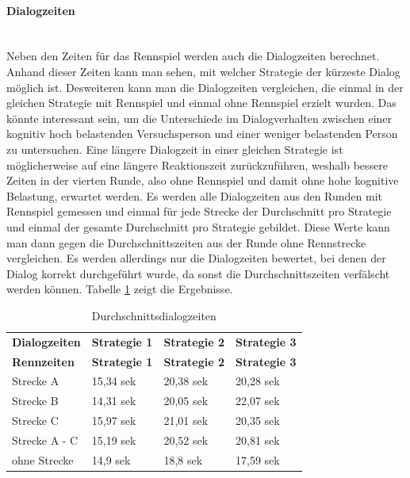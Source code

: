\documentclass[12pt,a4paper]{scrartcl}
\begin{document}
\paragraph{Dialogzeiten}
~\\
Neben den Zeiten für das Rennspiel werden auch die Dialogzeiten berechnet. Anhand dieser Zeiten kann man sehen, mit welcher Strategie der kürzeste Dialog möglich ist. Desweiteren kann man die Dialogzeiten vergleichen, die einmal in der gleichen Strategie mit Rennspiel und einmal ohne Rennspiel erzielt wurden. Das könnte interessant sein, um die Unterschiede im Dialogverhalten zwischen einer kognitiv hoch belastenden Versuchsperson und einer weniger belastenden Person zu untersuchen. Eine längere Dialogzeit in einer gleichen Strategie ist möglicherweise auf eine längere Reaktionszeit zurückzuführen, weshalb bessere Zeiten in der vierten Runde, also ohne Rennspiel und damit ohne hohe kognitive Belastung, erwartet werden. Es werden alle Dialogzeiten aus den Runden mit Rennspiel gemessen und einmal für jede Strecke der Durchschnitt pro Strategie und einmal der gesamte Durchschnitt pro Strategie gebildet. Diese Werte kann man dann gegen die Durchschnittszeiten aus der Runde ohne Rennstrecke vergleichen. Es werden allerdings nur die Dialogzeiten bewertet, bei denen der Dialog korrekt durchgeführt wurde, da sonst die Durchschnittszeiten verfälscht werden können.  Tabelle \ref{Durchschnittsdialogzeiten1} zeigt die Ergebnisse.

\begin{longtable}{p{3cm}p{3cm}p{3cm}p{3cm} }
	\label{Durchschnittsdialogzeiten1}\\
	\caption[Durchschnittsdialogzeiten]{Durchschnittsdialogzeiten}\\
	\hline
	\textbf{Dialogzeiten}&\textbf{Strategie 1}&\textbf{Strategie 2} &\textbf{Strategie 3}\\
	\hline
	\endfirsthead
	\hline
	\textbf{Rennzeiten}&\textbf{Strategie 1}&\textbf{Strategie 2} &\textbf{Strategie 3}\\
	\hline
	\endhead
Strecke A & 15,34 sek & 20,38 sek & 20,28 sek \\
Strecke B & 14,31 sek & 20,05 sek & 22,07 sek \\
Strecke C  & 15,97 sek & 21,01 sek & 20,35 sek \\
\hline
\hline
Strecke A - C & 15,19 sek & 20,52 sek & 20,81 sek \\
\hline
ohne Strecke &  14,9 sek & 18,8 sek & 17,59 sek \\
\hline
\end{longtable}
\end{document}
